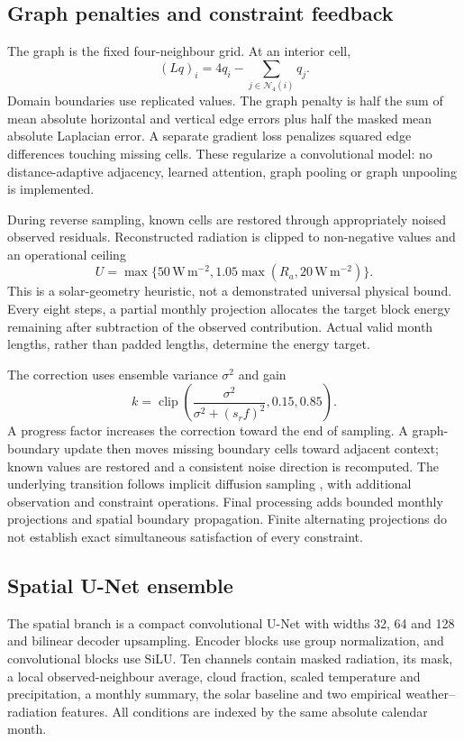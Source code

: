 \documentclass[preprint,12pt,authoryear]{elsarticle}
\newcommand{\wm}{\ensuremath{\mathrm{W\,m^{-2}}}}
\begin{document}
\subsection{Graph penalties and constraint feedback}
The graph is the fixed four-neighbour grid. At an interior cell,
\begin{equation}(Lq)_i=4q_i-\sum_{j\in\mathcal N_4(i)}q_j.\end{equation}
Domain boundaries use replicated values. The graph penalty is half the sum of mean absolute horizontal and vertical edge errors plus half the masked mean absolute Laplacian error. A separate gradient loss penalizes squared edge differences touching missing cells. These regularize a convolutional model: no distance-adaptive adjacency, learned attention, graph pooling or graph unpooling is implemented.

During reverse sampling, known cells are restored through appropriately noised observed residuals. Reconstructed radiation is clipped to non-negative values and an operational ceiling
\begin{equation}U=\max\{50\,\wm,1.05\max(R_a,20\,\wm)\}.\end{equation}
This is a solar-geometry heuristic, not a demonstrated universal physical bound. Every eight steps, a partial monthly projection allocates the target block energy remaining after subtraction of the observed contribution. Actual valid month lengths, rather than padded lengths, determine the energy target.

The correction uses ensemble variance $\sigma^2$ and gain
\begin{equation}
k=\operatorname{clip}\left(\frac{\sigma^2}{\sigma^2+(s_r f)^2},0.15,0.85\right).
\end{equation}
A progress factor increases the correction toward the end of sampling. A graph-boundary update then moves missing boundary cells toward adjacent context; known values are restored and a consistent noise direction is recomputed. The underlying transition follows implicit diffusion sampling \citep{song2021}, with additional observation and constraint operations. Final processing adds bounded monthly projections and spatial boundary propagation. Finite alternating projections do not establish exact simultaneous satisfaction of every constraint.

\subsection{Spatial U-Net ensemble}
The spatial branch is a compact convolutional U-Net with widths 32, 64 and 128 and bilinear decoder upsampling. Encoder blocks use group normalization, and convolutional blocks use SiLU. Ten channels contain masked radiation, its mask, a local observed-neighbour average, cloud fraction, scaled temperature and precipitation, a monthly summary, the solar baseline and two empirical weather--radiation features. All conditions are indexed by the same absolute calendar month.
\end{document}
